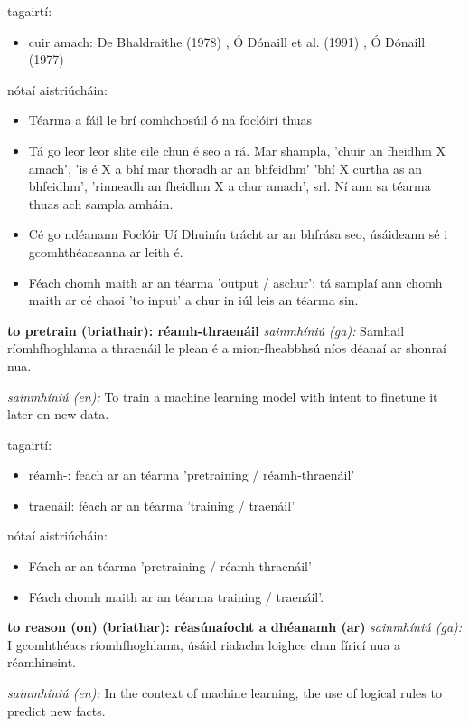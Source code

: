 \documentclass{article}
\begin{document}
tagairtí:
\begin{itemize}
	\item cuir amach: De Bhaldraithe (1978) \cite{de-bhaldraithe}, Ó Dónaill et al. (1991) \cite{focloir-beag}, Ó Dónaill (1977) \cite{odonaill}
\end{itemize}

nótaí aistriúcháin:
\begin{itemize}
	\item Téarma a fáil le brí comhchosúil ó na foclóirí thuas
	\item Tá go leor leor slite eile chun é seo a rá. Mar shampla, 'chuir an fheidhm X amach', 'is é X a bhí mar thoradh ar an bhfeidhm' 'bhí X curtha as an bhfeidhm', 'rinneadh an fheidhm X a chur amach', srl. Ní ann sa téarma thuas ach sampla amháin.
	\item Cé go ndéanann Foclóir Uí Dhuinín trácht ar an bhfrása seo, úsáideann sé i gcomhthéacsanna ar leith é.
	\item Féach chomh maith ar an téarma 'output / aschur'; tá samplaí ann chomh maith ar cé chaoi 'to input' a chur in iúl leis an téarma sin.
\end{itemize}


\textbf{to pretrain (briathair): réamh-thraenáil}
\textit{sainmhíniú (ga):} Samhail ríomhfhoghlama a thraenáil le plean é a mion-fheabbhsú níos déanaí ar shonraí nua.

\textit{sainmhíniú (en):} To train a machine learning model with intent to finetune it later on new data.

tagairtí:
\begin{itemize}
	\item réamh-: feach ar an téarma 'pretraining / réamh-thraenáil'
	\item traenáil: féach ar an téarma 'training / traenáil'
\end{itemize}

nótaí aistriúcháin:
\begin{itemize}
	\item Féach ar an téarma 'pretraining / réamh-thraenáil'
	\item Féach chomh maith ar an téarma training / traenáil'.
\end{itemize}


\textbf{to reason (on) (briathar): réasúnaíocht a dhéanamh (ar)}
\textit{sainmhíniú (ga):} I gcomhthéacs ríomhfhoghlama, úsáid rialacha loighce chun fíricí nua a réamhinsint.

\textit{sainmhíniú (en):} In the context of machine learning, the use of logical rules to predict new facts.
\end{document}
